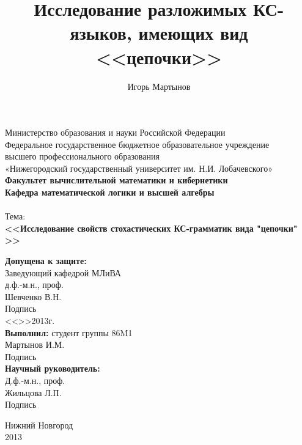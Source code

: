 \documentclass[12pt]{article}
\title{Исследование разложимых КС-языков, имеющих вид <<цепочки>>}
\author{Игорь Мартынов}
\begin{document}
\clearpage

\begin{titlepage}
	\begin{center}
		Министерство образования и науки Российской Федерации \\
		Федеральное государственное бюджетное образовательное учреждение \\
		высшего профессионального образования \\
		«Нижегородский государственный университет им. Н.И. Лобачевского» \\
		
		\vspace{5mm}
		\textbf{Факультет вычислительной математики и кибернетики} \\
		\vspace{3mm}
		\textbf{Кафедра математической логики и высшей алгебры} \\
		\vspace{25mm}
		{\Large \textbf{} } \\
		\vspace{10mm}
		Тема: \\
		{\large \textbf{<<Исследование свойств стохастических КС-грамматик вида "цепочки" {>>}} }
		\vspace{10mm}
	\end{center}
	
	\begin{addmargin}[9cm]{0cm}
		\textbf{Допущена к защите:}\\
		Заведующий кафедрой МЛиВА \\
		д.ф.-м.н., проф. \\
		\underline{\hspace{3cm}} Шевченко В.Н.\\
		Подпись \\
		<<\underline{\hspace{1cm}}>>\underline{\hspace{2cm}}2013г. \vspace{5mm} \\	
		\textbf{Выполнил:} студент группы 86M1\\
		\underline{\hspace{3cm}} Мартынов И.М.\\
		Подпись \vspace{5mm} \\
		\textbf{Научный руководитель:} \\
		Д.ф.-м.н., проф. \\
		\underline{\hspace{3cm}} Жильцова Л.П. \\
		Подпись
		
	\end{addmargin}
	
	\vfill
	\begin{center}
		Нижний Новгород\\
		2013
	\end{center}
\end{titlepage}
\end{document}
